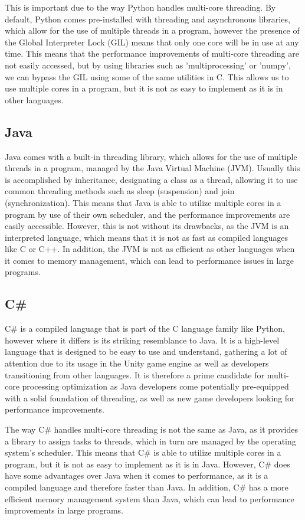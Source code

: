 \documentclass{article}
\begin{document}
This is important due to the way Python handles multi-core threading. By default, Python comes pre-installed with threading and asynchronous libraries, which allow for the use of multiple threads in a program, however the presence of the Global Interpreter Lock (GIL) means that only one core will be in use at any time. This means that the performance improvements of multi-core threading are not easily accessed, but by using libraries such as 'multiprocessing' or 'numpy', we can bypass the GIL using some of the same utilities in C. This allows us to use multiple cores in a program, but it is not as easy to implement as it is in other languages.

\subsection{Java}

Java comes with a built-in threading library, which allows for the use of multiple threads in a program, managed by the Java Virtual Machine (JVM). Usually this is accomplished by inheritance, designating a class as a thread, allowing it to use common threading methods such as sleep (suspension) and join (synchronization). This means that Java is able to utilize multiple cores in a program by use of their own scheduler, and the performance improvements are easily accessible. However, this is not without its drawbacks, as the JVM is an interpreted language, which means that it is not as fast as compiled languages like C or C++. In addition, the JVM is not as efficient as other languages when it comes to memory management, which can lead to performance issues in large programs. 

\subsection{C\#}

C\# is a compiled language that is part of the C language family like Python, however where it differs is its striking resemblance to Java. It is a high-level language that is designed to be easy to use and understand, gathering a lot of attention due to its usage in the Unity game engine as well as developers transitioning from other languages. It is therefore a prime candidate for multi-core processing optimization as Java developers come potentially pre-equipped with a solid foundation of threading, as well as new game developers looking for performance improvements.

The way C\# handles multi-core threading is not the same as Java, as it provides a library to assign tasks to threads, which in turn are managed by the operating system's scheduler. This means that C\# is able to utilize multiple cores in a program, but it is not as easy to implement as it is in Java. However, C\# does have some advantages over Java when it comes to performance, as it is a compiled language and therefore faster than Java. In addition, C\# has a more efficient memory management system than Java, which can lead to performance improvements in large programs.
\end{document}
